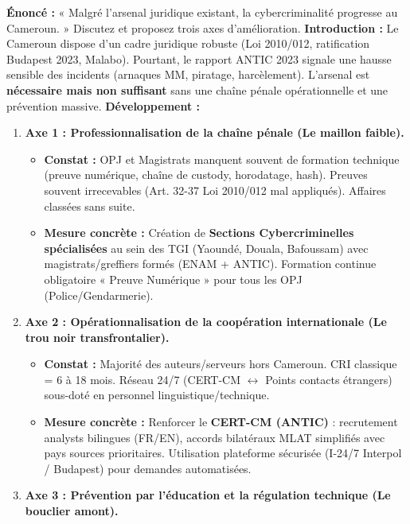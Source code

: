 \documentclass[11pt]{article}
\begin{document}
\begin{exoresolu}
    \textbf{Énoncé :} « Malgré l'arsenal juridique existant, la cybercriminalité progresse au Cameroun. » Discutez et proposez trois axes d'amélioration.
    \tcblower
    \textbf{Introduction :} Le Cameroun dispose d'un cadre juridique robuste (Loi 2010/012, ratification Budapest 2023, Malabo). Pourtant, le rapport ANTIC 2023 signale une hausse sensible des incidents (arnaques MM, piratage, harcèlement). L'arsenal est \textbf{nécessaire mais non suffisant} sans une chaîne pénale opérationnelle et une prévention massive.
    \textbf{Développement :}
    \begin{enumerate}
        \item \textbf{Axe 1 : Professionnalisation de la chaîne pénale (Le maillon faible).}
              \begin{itemize}
                  \item \textbf{Constat :} OPJ et Magistrats manquent souvent de formation technique (preuve numérique, chaîne de custody, horodatage, hash). Preuves souvent irrecevables (Art. 32-37 Loi 2010/012 mal appliqués). Affaires classées sans suite.
                  \item \textbf{Mesure concrète :} Création de \textbf{Sections Cybercriminelles spécialisées} au sein des TGI (Yaoundé, Douala, Bafoussam) avec magistrats/greffiers formés (ENAM + ANTIC). Formation continue obligatoire « Preuve Numérique » pour tous les OPJ (Police/Gendarmerie).
              \end{itemize}
        \item \textbf{Axe 2 : Opérationnalisation de la coopération internationale (Le trou noir transfrontalier).}
              \begin{itemize}
                  \item \textbf{Constat :} Majorité des auteurs/serveurs hors Cameroun. CRI classique = 6 à 18 mois. Réseau 24/7 (CERT-CM $\leftrightarrow$ Points contacts étrangers) sous-doté en personnel linguistique/technique.
                  \item \textbf{Mesure concrète :} Renforcer le \textbf{CERT-CM (ANTIC)} : recrutement analysts bilingues (FR/EN), accords bilatéraux MLAT simplifiés avec pays sources prioritaires. Utilisation plateforme sécurisée (I-24/7 Interpol / Budapest) pour demandes automatisées.
              \end{itemize}
        \item \textbf{Axe 3 : Prévention par l'éducation et la régulation technique (Le bouclier amont).}

\end{enumerate}
\end{exoresolu}
\end{document}
